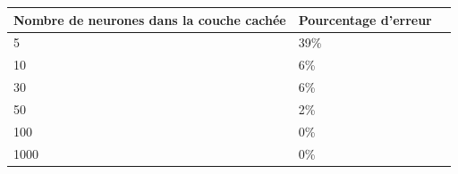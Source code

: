 \documentclass[a4paper,11pt,oneside,roman]{article}
\begin{document}
    \begin{tabular}{|l|l|l|}
        \hline
        Nombre de neurones dans la couche cachée & Pourcentage d'erreur \\\hline  \hline
        5 & 39\% \\ \hline
        10 & 6\% \\ \hline
        30 & 6\% \\ \hline
        50 & 2\% \\ \hline
        100 & 0\% \\ \hline
        1000 & 0\% \\ \hline
    \end{tabular}
    
    

    
\end{document}
